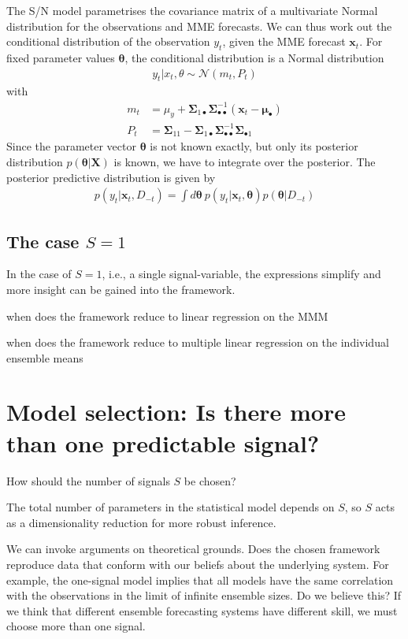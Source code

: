 \documentclass[12pt]{article}
\renewcommand{\vec}[1]{\bm{#1}}
\newcommand{\mat}[1]{\bm{#1}}
\begin{document}
The S/N model parametrises the covariance matrix of a multivariate Normal distribution for the observations and MME forecasts.
We can thus work out the conditional distribution of the observation $y_t$, given the MME forecast $\vec{x}_t$.
For fixed parameter values $\vec{\theta}$, the conditional distribution is a Normal distribution 
%
\begin{align}
y_t | x_t, \theta \sim \mathcal{N}(m_t, P_t)
\end{align}
with
\begin{align}
m_t & = \mu_y + \mat{\Sigma}_{1\bullet}\mat{\Sigma}_{\bullet\bullet}^{-1}(\vec{x}_t - \vec{\mu}_{\bullet}) \\
P_t & = \mat{\Sigma}_{11} - \mat{\Sigma}_{1\bullet}\mat{\Sigma}_{\bullet\bullet}^{-1}\mat{\Sigma}_{\bullet 1}
\end{align}
%
Since the parameter vector $\vec{\theta}$ is not known exactly, but only its posterior distribution $p(\vec{\theta} | \mat{X})$ is known, we have to integrate over the posterior.
The posterior predictive distribution is given by
%
\begin{align}
p(y_t | \vec{x}_t, D_{-t}) = \int d\vec{\theta}\ p(y_t|\vec{x}_t, \vec{\theta}) p(\vec{\theta} | D_{-t})
\end{align}
%


\subsection{The case $S=1$}

In the case of $S=1$, i.e., a single signal-variable, the expressions simplify and more insight can be gained into the framework.


when does the framework reduce to linear regression on the MMM

when does the framework reduce to multiple linear regression on the individual ensemble means



\section{Model selection: Is there more than one predictable signal?}

How should the number of signals $S$ be chosen?


The total number of parameters in the statistical model depends on $S$, so $S$ acts as a dimensionality reduction for more robust inference.


We can invoke arguments on theoretical grounds. 
Does the chosen framework reproduce data that conform with our beliefs about the underlying system. 
For example, the one-signal model implies that all models have the same correlation with the observations in the limit of infinite ensemble sizes. 
Do we believe this?
If we think that different ensemble forecasting systems have different skill, we must choose more than one signal.
\end{document}
